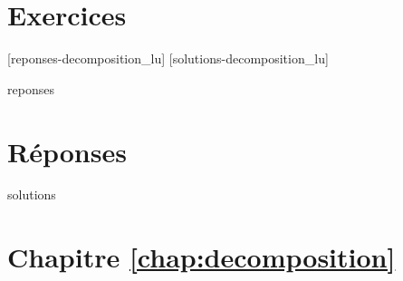 \section{Exercices}
\label{chap:decomposition:exercices}


[reponses-decomposition_lu]
[solutions-decomposition_lu]

\begin{Filesave}{reponses}
\bigskip
\section*{Réponses}

\end{Filesave}

\begin{Filesave}{solutions}
\section*{Chapitre \ref{chap:decomposition}}

\end{Filesave}


